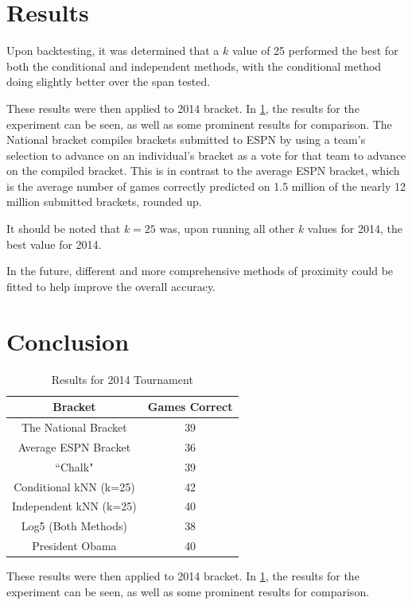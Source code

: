 \documentclass[5p, preprint]{elsarticle}
\begin{document}
\section{Results}

Upon backtesting, it was determined that a $k$ value of 25 performed the best for both the conditional and independent methods, with the conditional method doing slightly better over the span tested.

These results were then applied to 2014 bracket. In \ref{tab_2014}, the results for the experiment can be seen, as well as some prominent results for comparison. The National bracket compiles brackets submitted to ESPN by using a team's selection to advance on an individual's bracket as a vote for that team to advance on the compiled bracket. This is in contrast to the average ESPN bracket, which is the average number of games correctly predicted on 1.5 million of the nearly 12 million submitted brackets, rounded up.  

It should be noted that $k=25$ was, upon running all other $k$ values for 2014, the best value for 2014.

In the future, different and more comprehensive methods of proximity could be fitted to help improve the overall accuracy.



\section{Conclusion}

\begin{table}[!t]
\caption{Results for 2014 Tournament}
\label{tab_2014}
\centering

\begin{tabular}{|c|c|}
\hline
Bracket & Games Correct\\
\hline
\hline
The National Bracket & 39\\
Average ESPN Bracket & 36\\
``Chalk" & 39\\
Conditional kNN (k=25) & 42\\
Independent kNN (k=25) & 40\\
Log5 (Both Methods) & 38\\
President Obama & 40\\

\hline
\end{tabular}
\end{table}

These results were then applied to 2014 bracket. In \ref{tab_2014}, the results for the experiment can be seen, as well as some prominent results for comparison.
\end{document}

